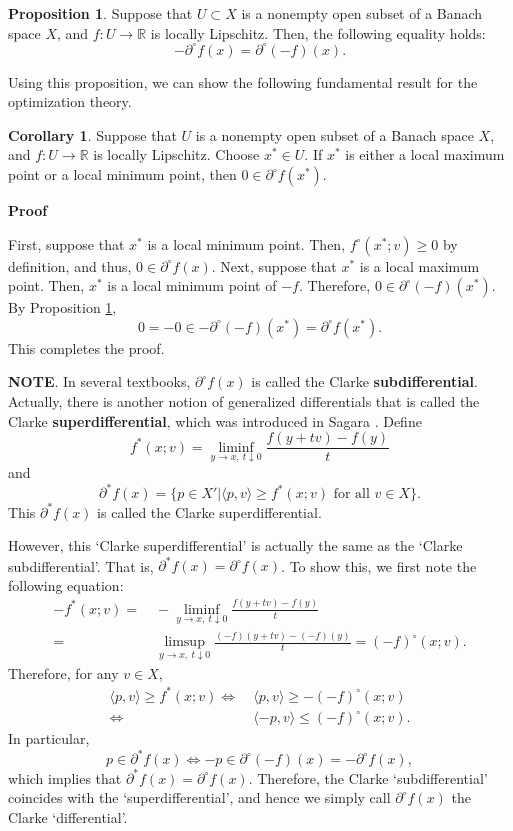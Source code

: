 \documentclass[a4paper,12pt]{article}
\makeatletter
\renewenvironment{proof}[1][\proofname]{\par
  \pushQED{\qed}%
  \normalfont \topsep6\p@\@plus6\p@\relax
  \trivlist
  \item\relax
  {\bfseries
  #1\@addpunct{.}}\hspace\labelsep\ignorespaces
}{%
  \popQED\endtrivlist\@endpefalse
}
\theoremstyle{definition}
\newtheorem{prop}{Proposition}
\newtheorem{cor}{Corollary}
\renewcommand{\proofname}{Proof}
\makeatother
\begin{document}
\begin{prop}\label{prop3}
Suppose that $U\subset X$ is a nonempty open subset of a Banach space $X$, and $f:U\to \mathbb{R}$ is locally Lipschitz. Then, the following equality holds:
\[-\partial^{\circ}f(x)=\partial^{\circ}(-f)(x).\]
\end{prop}

Using this proposition, we can show the following fundamental result for the optimization theory.

\begin{cor}\label{cor1}
Suppose that $U$ is a nonempty open subset of a Banach space $X$, and $f:U\to \mathbb{R}$ is locally Lipschitz. Choose $x^*\in U$. If $x^*$ is either a local maximum point or a local minimum point, then $0\in \partial^{\circ}f(x^*)$.
\end{cor}

\begin{proof}
First, suppose that $x^*$ is a local minimum point. Then, $f^{\circ}(x^*;v)\ge 0$ by definition, and thus, $0\in \partial^{\circ}f(x)$. Next, suppose that $x^*$ is a local maximum point. Then, $x^*$ is a local minimum point of $-f$. Therefore, $0\in \partial^{\circ}(-f)(x^*)$. By Proposition \ref{prop3},
\[0=-0\in -\partial^{\circ}(-f)(x^*)=\partial^{\circ}f(x^*).\]
This completes the proof.
\end{proof}


\vspace{12pt}
\noindent
{\bf NOTE}. In several textbooks, $\partial^{\circ}f(x)$ is called the Clarke {\bf subdifferential}. Actually, there is another notion of generalized differentials that is called the Clarke {\bf superdifferential}, which was introduced in Sagara \cite{S}. Define
\[f^*(x;v)=\liminf_{y\to x,\ t\downarrow 0}\frac{f(y+tv)-f(y)}{t}\]
and
\[\partial^*f(x)=\{p\in X'|\langle p,v\rangle\ge f^*(x;v)\mbox{ for all }v\in X\}.\]
This $\partial^*f(x)$ is called the Clarke superdifferential.

However, this `Clarke superdifferential' is actually the same as the `Clarke subdifferential'. That is, $\partial^*f(x)=\partial^{\circ}f(x)$. To show this, we first note the following equation:
\begin{align*}
-f^*(x;v)=&~-\liminf_{y\to x,\ t\downarrow 0}\frac{f(y+tv)-f(y)}{t}\\
=&~\limsup_{y\to x,\ t\downarrow 0}\frac{(-f)(y+tv)-(-f)(y)}{t}=(-f)^{\circ}(x;v).
\end{align*}
Therefore, for any $v\in X$,
\begin{align*}
\langle p,v\rangle \ge f^*(x;v)\Leftrightarrow&~\langle p,v\rangle\ge -(-f)^{\circ}(x;v)\\
\Leftrightarrow&~\langle -p,v\rangle\le (-f)^{\circ}(x;v).
\end{align*}
In particular, 
\[p\in \partial^*f(x)\Leftrightarrow -p\in \partial^{\circ}(-f)(x)=-\partial^{\circ}f(x),\]
which implies that $\partial^*f(x)=\partial^{\circ}f(x)$. Therefore, the Clarke `subdifferential' coincides with the `superdifferential', and hence we simply call $\partial^{\circ}f(x)$ the Clarke `differential'.
\end{document}
